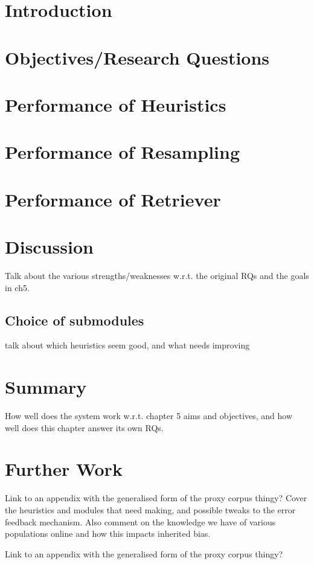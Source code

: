 \section*{Introduction}
\label{sec:evaluation:introduction}



\section{Objectives/Research Questions}
\label{sec:evaluation:rqs}



\section{Performance of Heuristics}
\label{sec:evaluation:heuristics}



\section{Performance of Resampling}
\label{sec:evaluation:resampler}



\section{Performance of Retriever}
\label{sec:evaluation:retrieval}



\section{Discussion}
\label{sec:evaluation:discussion}
Talk about the various strengths/weaknesses w.r.t. the original RQs and the goals in ch5.
\subsection{Choice of submodules}
talk about which heuristics seem good, and what needs improving


\section{Summary}
How well does the system work w.r.t. chapter 5 aims and objectives, and how well does this chapter answer its own RQs.


\section{Further Work}
Link to an appendix with the generalised form of the proxy corpus thingy?
\label{sec:evaluation:furtherwork}
Cover the heuristics and modules that need making, and possible tweaks to the error feedback mechanism.  Also comment on the knowledge we have of various populations online and how this impacts inherited bias.

Link to an appendix with the generalised form of the proxy corpus thingy?
